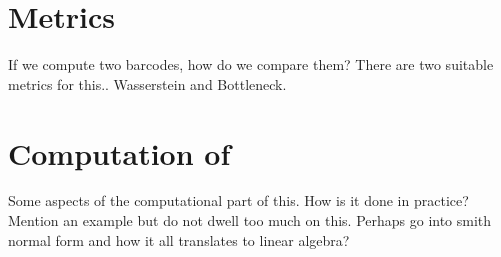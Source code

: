   \section{Metrics}
  If we compute two barcodes, how do we compare them? There are two suitable metrics for this.. Wasserstein and Bottleneck.
\section{Computation of }
Some aspects of the computational part of this. How is it done in practice? Mention an example but do not dwell too much on this. Perhaps go into smith normal form and how it all translates to linear algebra?
